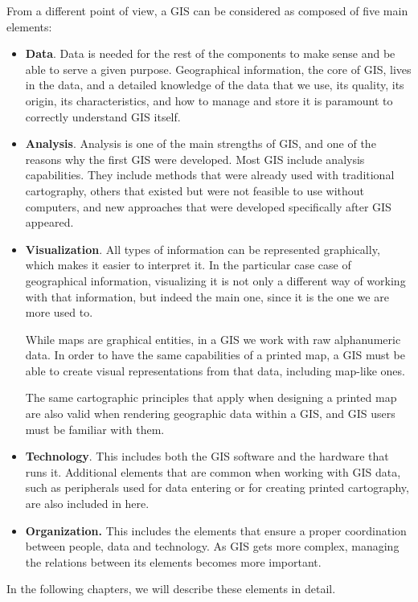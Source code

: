From a different point of view, a GIS can be considered as composed of five main elements:


\begin{itemize}
 \item \textbf{Data}. Data is needed for the rest of the components to make sense and be able to serve a given purpose. Geographical information, the core of GIS, lives in the data, and a detailed knowledge of the data that we use, its quality, its origin, its characteristics, and how to manage and store it is paramount to correctly understand GIS itself.

\item \textbf{Analysis}. Analysis is one of the main strengths of GIS, and one of the reasons why the first GIS were developed. Most GIS include analysis capabilities. They include methods that were already used with traditional cartography, others that existed but were not feasible to use without computers, and new approaches that were developed specifically after GIS appeared.

\item \textbf{Visualization}. All types of information can be represented graphically, which makes it easier to interpret it. In the particular case case of geographical information, visualizing it is not only a different way of working with that information, but indeed the main one, since it is the one we are more used to.

While maps are graphical entities, in a GIS we work with raw alphanumeric data. In order to have the same capabilities of a printed map, a GIS must be able to create visual representations from that data, including map-like ones.

The same cartographic principles that apply when designing a printed map are also valid when rendering geographic data within a GIS, and GIS users must be familiar with them. 

\item \textbf{Technology}. This includes both the GIS software and the hardware that runs it. Additional elements that are common when working with GIS data, such as peripherals used for data entering or for creating printed cartography, are also included in here.

\item \textbf{Organization.} This includes the elements that ensure a proper coordination between people, data and technology. As GIS gets more complex, managing the relations between its elements becomes more important.
\end{itemize}

In the following chapters, we will describe these elements in detail.

\pagestyle{empty}